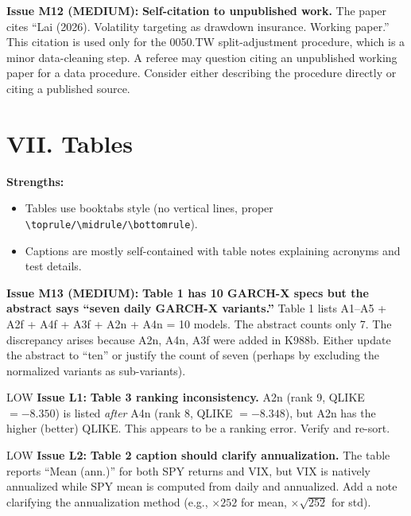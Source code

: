 \documentclass[12pt,a4paper]{article}
\begin{document}
\bigskip

\textcolor{warncolor}{\textbf{Issue M12 (MEDIUM):}} \textbf{Self-citation to unpublished work.} The paper cites ``Lai (2026). Volatility targeting as drawdown insurance. Working paper.'' This citation is used only for the 0050.TW split-adjustment procedure, which is a minor data-cleaning step. A referee may question citing an unpublished working paper for a data procedure. Consider either describing the procedure directly or citing a published source.


\section*{VII. Tables}

\textcolor{okgreen}{\textbf{Strengths:}}
\begin{itemize}
\item Tables use booktabs style (no vertical lines, proper \verb|\toprule/\midrule/\bottomrule|).
\item Captions are mostly self-contained with table notes explaining acronyms and test details.
\end{itemize}

\textcolor{warncolor}{\textbf{Issue M13 (MEDIUM):}} \textbf{Table 1 has 10 GARCH-X specs but the abstract says ``seven daily GARCH-X variants.''} Table 1 lists A1--A5 + A2f + A4f + A3f + A2n + A4n = 10 models. The abstract counts only 7. The discrepancy arises because A2n, A4n, A3f were added in K988b. Either update the abstract to ``ten'' or justify the count of seven (perhaps by excluding the normalized variants as sub-variants).

\bigskip

LOW \textbf{Issue L1:} \textbf{Table 3 ranking inconsistency.} A2n (rank 9, QLIKE $= -8.350$) is listed \emph{after} A4n (rank 8, QLIKE $= -8.348$), but A2n has the higher (better) QLIKE. This appears to be a ranking error. Verify and re-sort.

\bigskip

LOW \textbf{Issue L2:} \textbf{Table 2 caption should clarify annualization.} The table reports ``Mean (ann.)'' for both SPY returns and VIX, but VIX is natively annualized while SPY mean is computed from daily and annualized. Add a note clarifying the annualization method (e.g., $\times 252$ for mean, $\times \sqrt{252}$ for std).
\end{document}
